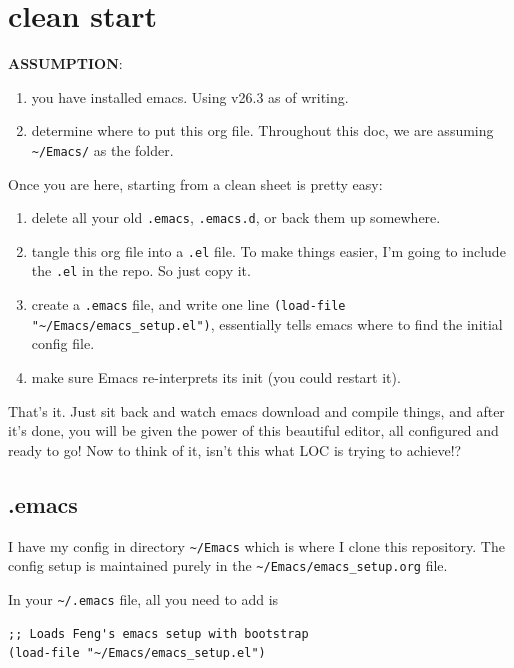 \documentclass[11pt]{article}
\begin{document}
\section{clean start}
\label{sec:orgd2eac0b}

\textbf{ASSUMPTION}:

\begin{enumerate}
\item you have installed emacs. Using v26.3 as of writing.
\item determine where to put this org file. Throughout this doc, we are
assuming \texttt{\textasciitilde{}/Emacs/} as the folder.
\end{enumerate}

Once you are here, starting from a clean sheet is pretty easy:

\begin{enumerate}
\item delete all your old \texttt{.emacs}, \texttt{.emacs.d}, or back them up somewhere.
\item tangle this org file into a \texttt{.el} file. To make things easier, I'm
going to include the \texttt{.el} in the repo. So just copy it.
\item create a \texttt{.emacs} file, and write one line \texttt{(load-file
   "\textasciitilde{}/Emacs/emacs\_setup.el")}, essentially tells emacs where to find
the initial config file.
\item make sure Emacs re-interprets its init (you could restart it).
\end{enumerate}

That's it. Just sit back and watch emacs download and compile things,
and after it's done, you will be given the power of this beautiful
editor, all configured and ready to go! Now to think of it, isn't this
what LOC is trying to achieve!?

\subsection{.emacs}
\label{sec:orga1aa6d1}

I have my config in directory \texttt{\textasciitilde{}/Emacs} which is where I clone this
repository. The config setup is maintained purely in the
\texttt{\textasciitilde{}/Emacs/emacs\_setup.org} file.

In your \texttt{\textasciitilde{}/.emacs} file, all you need to add is

\begin{verbatim}
;; Loads Feng's emacs setup with bootstrap
(load-file "~/Emacs/emacs_setup.el")
\end{verbatim}
\end{document}
